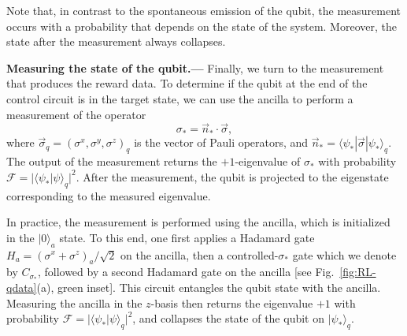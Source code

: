 Note that, in contrast to the spontaneous emission of the qubit, the measurement occurs with a probability that depends on the state of the system. Moreover, the state after the measurement always collapses. 

\textbf{Measuring the state of the qubit.---} Finally, we turn to the measurement that produces the reward data. To determine if the qubit at the end of the control circuit is in the target state, we can use the ancilla to perform a measurement of the operator 
\begin{equation}
    \sigma_\ast = \vec n_\ast \cdot \vec \sigma,
\end{equation}
where $\vec \sigma_q = (\sigma^x,\sigma^y,\sigma^z)_q$ is the vector of Pauli operators, and $\vec n_\ast  = \langle \psi_\ast|\vec \sigma|\psi_\ast\rangle_q$. The output of the measurement returns the $+1$-eigenvalue of $\sigma_\ast$ with probability $\mathcal F=|\langle\psi_\ast |\psi\rangle_q|^2$. After the measurement, the qubit is projected to the eigenstate corresponding to the measured eigenvalue.  

In practice, the measurement is performed using the ancilla, which is initialized in the $|0\rangle_a$ state. To this end, one first applies a Hadamard gate $H_a=(\sigma^x+\sigma^z)_a/\sqrt{2}$ on the ancilla, then a controlled-$\sigma_\ast$ gate which we denote by $C_{\sigma_\ast}$, followed by a second Hadamard gate on the ancilla [see Fig.~\ref{fig:RL-qdata}(a), green inset]. This circuit entangles the qubit state with the ancilla. Measuring the ancilla in the $z$-basis then returns the eigenvalue $+1$ with probability $\mathcal F=|\langle\psi_\ast |\psi\rangle_q|^2$, and collapses the state of the qubit on $|\psi_\ast\rangle_q$.

